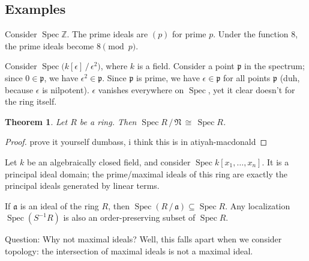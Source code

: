\documentclass[11pt]{article}
\newtheorem{theorem}{Theorem}
\newcommand{\Spec}{\operatorname{Spec}}
\begin{document}

\subsection{Examples}

Consider $\Spec \mathbb{Z}$. The prime ideals are $(p)$ for prime $p$. Under the function $8$, the prime ideals become $8 \pmod {p}$.

Consider $\Spec \big( k[\epsilon] \,/\, \epsilon^{2} \big)$, where $k$ is a field. Consider a point $\mathfrak{p}$ in the spectrum; since $0 \in \mathfrak{p}$, we have $\epsilon^{2} \in \mathfrak{p}$. Since $\mathfrak{p}$ is prime, we have $\epsilon \in \mathfrak{p}$ for all points $\mathfrak{p}$ (duh, because $\epsilon$ is nilpotent). $\epsilon$ vanishes everywhere on $\Spec$, yet it clear doesn't for the ring itself.

\begin{theorem}
  Let $R$ be a ring. Then $\Spec R \,/\, \mathfrak{N} \, \cong \, \Spec R$.
\end{theorem}
\begin{adjustwidth}{1cm}{}
  \begin{proof}
    prove it yourself dumbass, i think this is in atiyah-macdonald
  \end{proof}
\end{adjustwidth}

Let $k$ be an algebraically closed field, and consider $\Spec k[x_{1}, \ldots, x_{n}]$. It is a principal ideal domain; the prime/maximal ideals of this ring are exactly the principal ideals generated by linear terms.

If $\mathfrak{a}$ is an ideal of the ring $R$, then $\Spec (R \,/\, \mathfrak{a}) \subseteq \Spec R$. Any localization $\Spec (S^{-1}R)$ is also an order-preserving subset of $\Spec R$.

Question: Why not maximal ideals? Well, this falls apart when we consider topology: the intersection of maximal ideals is not a maximal ideal.

\end{document}
